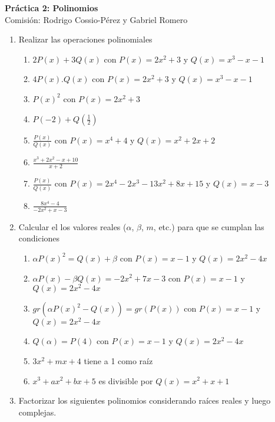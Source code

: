 \documentclass[a4paper]{article}
\newcommand{\exercise}{\item}
\newcommand{\df}[2]{\displaystyle\frac{#1}{#2}}
\begin{document}
\noindent \hrulefill 
\vspace{-7pt}
\begin{center} 
	\textbf{ Práctica 2: Polinomios } \\
	Comisión: Rodrigo Cossio-Pérez y Gabriel Romero
\end{center}
\vspace{-10pt}
\hrulefill
\begin{enumerate}
	\exercise Realizar las operaciones polinomiales
	\begin{multicols}{2}
	\begin{enumerate} [label=(\alph*)]
		\item $2P(x)+3Q(x)$ con $P(x)=2x^2+3$ y $Q(x)=x^3-x-1$
		\item $4P(x).Q(x)$ con $P(x)=2x^2+3$ y $Q(x)=x^3-x-1$
		\item $P(x)^2$ con $P(x)=2x^2+3$
		\item $P(-2)+Q\left(\df{1}{2}\right)$
		\item $\df{P(x)}{Q(x)}$ con $P(x)=x^4+4$ y $Q(x)=x^2+2x+2$
		\item $\df{x^3+2x^2-x+10}{x+2}$
		\item $\df{P(x)}{Q(x)}$ con $P(x)=2x^4-2x^3-13x^2+8x+15$ y $Q(x)=x-3$
		\item $\df{8x^4-4}{-2x^2+x-3}$
	\end{enumerate}
	\end{multicols}
	\exercise Calcular el los valores reales ($\alpha$, $\beta$, $m$, etc.) para que se cumplan las condiciones
	\begin{multicols}{2}
	\begin{enumerate} [label=(\alph*)]
		\item $\alpha P(x)^2 = Q(x) +\beta$ con $P(x)=x-1$ y $Q(x)=2x^2-4x$
		\item $\alpha P(x)-\beta Q(x) = -2x^2 +7x-3$ con $P(x)=x-1$ y $Q(x)=2x^2-4x$
		\item $gr\left(\alpha P(x)^2 - Q(x)\right)=gr\left(P(x)\right)$ con $P(x)=x-1$ y $Q(x)=2x^2-4x$
		\item $Q(\alpha)=P(4)$ con $P(x)=x-1$ y $Q(x)=2x^2-4x$
		\item $3x^2+mx+4$ tiene a 1 como raíz
		\item $x^3+ax^2+bx+5$ es divisible por $Q(x)=x^2+x+1$
	\end{enumerate}
	\end{multicols}
	\exercise Factorizar los siguientes polinomios considerando raíces reales y luego complejas.
	\begin{multicols}{2}

\end{multicols}
\end{enumerate}
\end{document}
